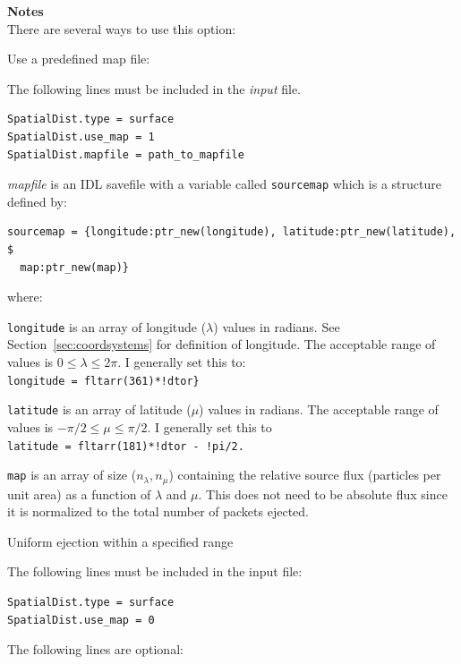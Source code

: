 \documentclass[11pt]{article}
\newcommand\descrip[1]{\textsf{\textbf{\large{#1}}}\\}
\begin{document}
\descrip{Notes}
There are several ways to use this option:
\begin{compactenum}
\item Use a predefined map file:
  \begin{compactenum}
  \item The following lines must be included in the \textit{input} file.
\begin{verbatim} 
SpatialDist.type = surface
SpatialDist.use_map = 1
SpatialDist.mapfile = path_to_mapfile
\end{verbatim}
  \item \textit{mapfile} is an IDL savefile with a variable called
  \texttt{sourcemap} which is a structure defined by: 
\begin{verbatim}
sourcemap = {longitude:ptr_new(longitude), latitude:ptr_new(latitude), $
  map:ptr_new(map)} 
\end{verbatim}
  where:
    \begin{compactitem}
    \item \texttt{longitude} is an array of longitude ($\lambda$) values in 
    radians. See
    Section~\ref{sec:coordsystems} for definition of longitude. The acceptable
    range of values is $0 \leq \lambda \leq 2\pi$. I generally set
    this to: \\ \verb+longitude = fltarr(361)*!dtor}+
    \item \texttt{latitude} is an array of latitude ($\mu$) values in radians. 
    The acceptable range of values is $-\pi/2 \leq \mu \leq \pi/2$. I
    generally set this to \\ \verb+latitude = fltarr(181)*!dtor - !pi/2.+
    \item \texttt{map} is an array of size ($n_\lambda,n_\mu$) containing the
    relative source flux (particles per unit area) as a function of $\lambda$
    and $\mu$. This does not need to be absolute flux since it is normalized to
    the total number of packets ejected.
    \end{compactitem}
  \end{compactenum}
\item Uniform ejection within a specified range
  \begin{compactenum}
  \item The following lines must be included in the input file:
  \begin{verbatim}
SpatialDist.type = surface
SpatialDist.use_map = 0
  \end{verbatim}
  The following lines are optional:
  \begin{verbatim}

\end{verbatim}
\end{compactenum}
\end{compactenum}
\end{document}
